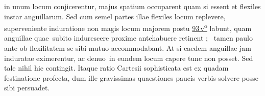 in unum locum conjicerentur,
majus spatium occuparent %
quam si essent
et flexiles%
%
instar anguillarum.%
Sed cum semel partes illae flexiles
locum replevere,%
superveniente induratione%
non magis locum majorem postu%
\lbrack%
\href{\Scan{LH_37_04_093v}}%
{93\,v\textsuperscript{o}}%
\rbrack%
labunt,
quam anguill\textlangle ae%
quae\textrangle\ subito indurescere
proxime antehabuere retinent%
\lbrack;\rbrack\
tamen paulo ante
ob flexilitatem%
se sibi mutuo accommodabant.%
At si eaedem anguillae%
jam induratae eximerentur,
ac denu\textlangle o\textrangle\ in eundem locum
capere tunc non posset.
Sed tale nihil hic contingit.
Itaque ratio Cartesii
sophisticata est%
ex quadam festinatione profecta,%
dum ille gravissimas quaestiones%
paucis verbis%
solvere posse
sibi persuadet.
\pend%
%
\frenchspacing%
\normalsize%
\newpage%
